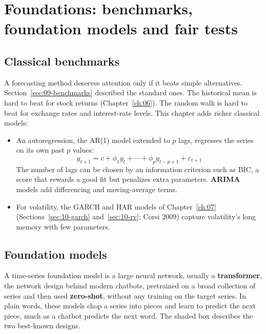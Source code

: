 \section{Foundations: benchmarks, foundation models and fair tests}
\label{sec:21-foundations}

\subsection{Classical benchmarks}

A forecasting method deserves attention only if it beats simple alternatives. Section~\ref{sec:09-benchmarks} described the standard ones. The historical mean is hard to beat for stock returns (Chapter~\ref{ch:06}). The random walk is hard to beat for exchange rates and interest-rate levels. This chapter adds richer classical models:
\begin{itemize}
  \item An autoregression, the AR(1) model extended to $p$ lags, regresses the series on its own past $p$ values:
  \begin{equation}
    y_{t+1} = c + \phi_1 y_t + \cdots + \phi_p y_{t-p+1} + \varepsilon_{t+1}
    \label{eq:21-ar}
  \end{equation}
  The number of lags can be chosen by an information criterion such as BIC, a score that rewards a good fit but penalizes extra parameters. \textbf{ARIMA} models add differencing and moving-average terms.
  \item For volatility, the GARCH and HAR models of Chapter~\ref{ch:07} (Sections~\ref{sec:10-garch} and~\ref{sec:10-rv}; Corsi 2009) capture volatility's long memory with few parameters.
\end{itemize}

\subsection{Foundation models}
\label{sec:21-fm}

A time-series foundation model is a large neural network, usually a \textbf{transformer}, the network design behind modern chatbots, pretrained on a broad collection of series and then used \textbf{zero-shot}, without any training on the target series. In plain words, these models chop a series into pieces and learn to predict the next piece, much as a chatbot predicts the next word. The shaded box describes the two best-known designs.

